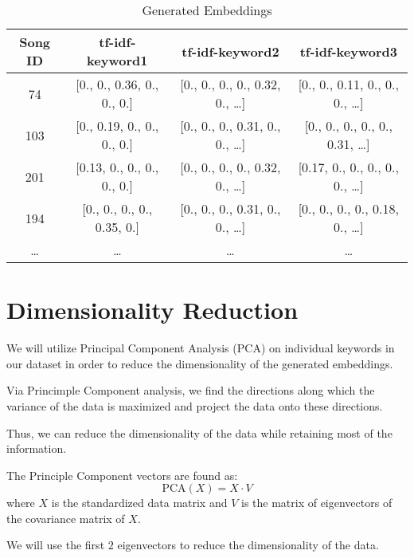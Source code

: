 \documentclass{article}
\begin{document}
\cite{word2vec_tfidf}
\begin{table}[h]
\centering
\begin{tabular}{|c|c|c|c|}
    \hline
    \textbf{Song ID} & \textbf{tf-idf-keyword1} & \textbf{tf-idf-keyword2} & \textbf{tf-idf-keyword3} \\
    \hline
    74 & [0., 0., 0.36, 0., 0., 0.] & [0., 0., 0., 0., 0.32, 0., \ldots] & [0., 0., 0.11, 0., 0., 0., \ldots] \\
    103 & [0., 0.19, 0., 0., 0., 0.] & [0., 0., 0., 0.31, 0., 0., \ldots] & [0., 0., 0., 0., 0., 0.31, \ldots] \\
    201 & [0.13, 0., 0., 0., 0., 0.] & [0., 0., 0., 0., 0.32, 0., \ldots] & [0.17, 0., 0., 0., 0., 0., \ldots] \\
    194 & [0., 0., 0., 0., 0.35, 0.] & [0., 0., 0., 0.31, 0., 0., \ldots] & [0., 0., 0., 0., 0.18, 0., \ldots] \\
    \ldots & \ldots & \ldots & \ldots \\
    \hline
\end{tabular}
\caption{Generated Embeddings}
\label{fig:head_of_dataframe}
\end{table}

\section{Dimensionality Reduction}
We will utilize Principal Component Analysis (PCA) on individual keywords in our dataset in order to reduce the dimensionality of the generated embeddings.

Via Princimple Component analysis, we find the directions along which the variance of the data is maximized and project the data onto these directions.

Thus, we can reduce the dimensionality of the data while retaining most of the information.

The Principle Component vectors are found as:
\begin{equation}
    \text{PCA}(X) = X \cdot V
\end{equation}
where $X$ is the standardized data matrix and $V$ is the matrix of eigenvectors of the covariance matrix of $X$.

We will use the first $2$ eigenvectors to reduce the dimensionality of the data.
\end{document}
